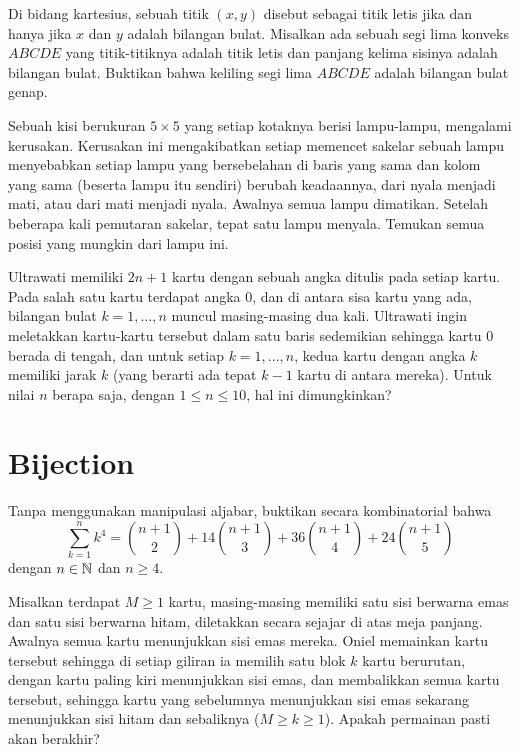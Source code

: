 \documentclass[11pt]{scrartcl}
\begin{document}
\begin{soaljawab}
    Di bidang kartesius, sebuah titik $(x,y)$ disebut sebagai titik letis jika dan
hanya jika $x$ dan $y$ adalah bilangan bulat. Misalkan ada sebuah segi lima konveks $ABCDE$
yang titik-titiknya adalah titik letis dan panjang kelima sisinya adalah bilangan bulat.
Buktikan bahwa keliling segi lima $ABCDE$ adalah bilangan bulat genap.
\end{soaljawab}

\begin{soaljawab}
    Sebuah kisi berukuran $5 \times 5$ yang setiap kotaknya berisi lampu-lampu, mengalami kerusakan. Kerusakan ini mengakibatkan setiap memencet sakelar sebuah lampu menyebabkan setiap lampu yang bersebelahan di baris yang sama dan kolom yang sama (beserta lampu itu sendiri) berubah keadaannya, dari nyala menjadi mati, atau dari mati menjadi nyala. Awalnya semua lampu dimatikan. Setelah beberapa kali pemutaran sakelar, tepat satu lampu menyala. Temukan semua posisi yang mungkin dari lampu ini.
\end{soaljawab}

\begin{soaljawab}
    Ultrawati memiliki $2n + 1$ kartu dengan sebuah angka ditulis pada setiap kartu. Pada salah satu kartu terdapat angka 0, dan di antara sisa kartu yang ada, bilangan bulat $k = 1, \dots, n$ muncul masing-masing dua kali. Ultrawati ingin meletakkan kartu-kartu tersebut dalam satu baris sedemikian sehingga kartu 0 berada di tengah, dan untuk setiap $k = 1, ..., n$, kedua kartu dengan angka $k$ memiliki jarak $k$ (yang berarti ada tepat $k - 1$ kartu di antara mereka). Untuk nilai $n$ berapa saja, dengan $1 \le n \le 10$, hal ini dimungkinkan?
\end{soaljawab}

\section{Bijection}
\begin{soaljawab}
    Tanpa menggunakan manipulasi aljabar, buktikan secara kombinatorial bahwa
    $$\sum_{k=1}^{n} k^4 = {n+1 \choose 2} + 14{n+1 \choose 3}+36{n+1 \choose 4}+24{n+1 \choose 5}$$ dengan $n\in \mathbb N$ dan $n \ge 4$.
\end{soaljawab}

\begin{soaljawab}
Misalkan terdapat $M \ge 1$ kartu, masing-masing memiliki satu sisi berwarna emas dan satu sisi berwarna hitam, diletakkan secara sejajar di atas meja panjang. Awalnya semua kartu menunjukkan sisi emas mereka. Oniel memainkan kartu tersebut sehingga di setiap giliran ia memilih satu blok $k$ kartu berurutan, dengan kartu paling kiri menunjukkan sisi emas, dan membalikkan semua kartu tersebut, sehingga kartu yang sebelumnya menunjukkan sisi emas sekarang menunjukkan sisi hitam dan sebaliknya ($M \ge k \ge 1$). Apakah permainan pasti akan berakhir?
\end{soaljawab}
\end{document}
